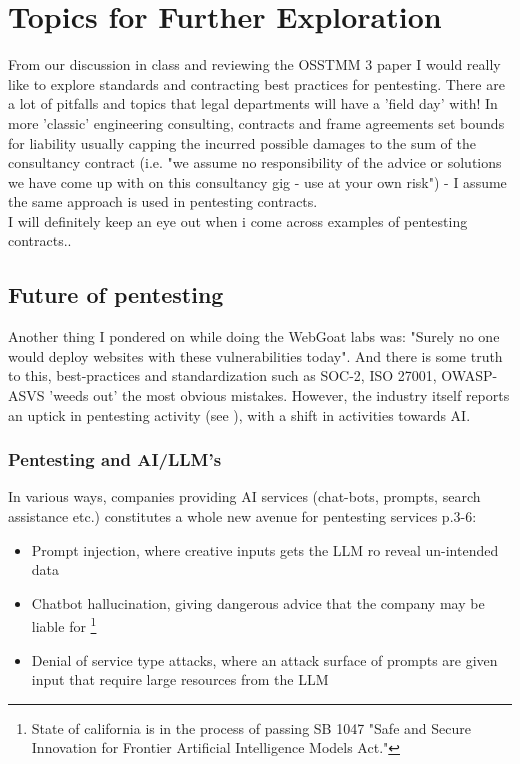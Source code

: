 \documentclass[
	letterpaper, %
	10pt, %
	unnumberedsections, %
	twoside, %
]{APAAssignment}
\begin{document}
\section{Topics for Further Exploration}
From our discussion in class and reviewing the OSSTMM 3 paper \cite{OSSTMM3} I would really like to explore standards and contracting best practices for pentesting. There are a lot of pitfalls and topics that legal departments will have a 'field day' with! In more 'classic' engineering consulting, contracts and frame agreements set bounds for liability usually capping the incurred possible damages to the sum of the consultancy contract (i.e. "we assume no responsibility of the advice or solutions we have come up with on this consultancy gig - use at your own risk") - I assume the same approach is used in pentesting contracts. \\ I will definitely keep an eye out when i come across examples of pentesting contracts.. 

\subsection{Future of pentesting}
Another thing I pondered on while doing the WebGoat labs was: "Surely no one would deploy websites with these vulnerabilities today". And there is some truth to this, best-practices and standardization such as SOC-2, ISO 27001, OWASP-ASVS \cite{OWASP-ASVS} 'weeds out' the most obvious mistakes. However, the industry itself reports an uptick in pentesting activity (see \cite{Cobalt2024}), with a shift in activities towards AI.

\subsubsection{Pentesting and AI/LLM's}
In various ways, companies providing AI services (chat-bots, prompts, search assistance etc.) constitutes a whole new avenue for pentesting services \cite{Cobalt2024}p.3-6: 
 
\begin{itemize}
	\item Prompt injection, where creative inputs gets the LLM ro reveal un-intended data  
	\item Chatbot hallucination, giving dangerous advice that the company may be liable for \footnote{State of california is in the process of passing SB 1047 "Safe and Secure Innovation for Frontier Artificial Intelligence Models Act."}
	\item Denial of service type attacks, where an attack surface of prompts are given input that require large resources from the LLM  
\end{itemize}
\end{document}
